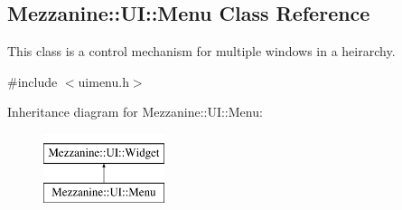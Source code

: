 \hypertarget{classMezzanine_1_1UI_1_1Menu}{
\subsection{Mezzanine::UI::Menu Class Reference}
\label{classMezzanine_1_1UI_1_1Menu}
}


This class is a control mechanism for multiple windows in a heirarchy.  




{\ttfamily \#include $<$uimenu.h$>$}

Inheritance diagram for Mezzanine::UI::Menu:\begin{figure}[H]
\begin{center}
\leavevmode
\includegraphics[height=2.000000cm]{classMezzanine_1_1UI_1_1Menu}
\end{center}
\end{figure}
